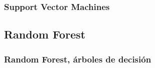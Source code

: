 \documentclass[10pt]{beamer}
\begin{document}
\begin{frame}
	\frametitle{Support Vector Machines}
	\begin{figure}[htbp]
		\centering
		\qquad\quad
	\end{figure}
\end{frame}

\subsection{Random Forest}

\begin{frame}
	\frametitle{Random Forest, \'arboles de decisi\'on}
	\begin{figure}[htbp]
		\centering
		\qquad\quad
	\end{figure}
\end{frame}
\end{document}
